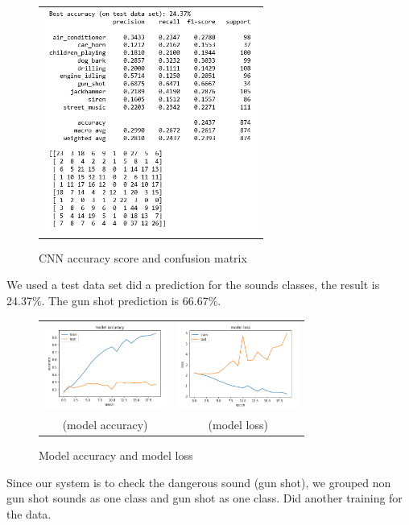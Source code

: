 \documentclass{article}
\begin{document}
\begin{figure}[!htb]
    \begin{tabular}{c}
        \includegraphics[width=7cm]{pic/CNN_Pm.png}\\
    \end{tabular}
	\caption{ CNN accuracy score and confusion matrix\label{figure7}}
\end{figure}
\newpage
We used a test data set did a prediction for the sounds classes, the result is 24.37\%. The gun shot prediction is 66.67\%.
\begin{figure}[!htb]
    \begin{tabular}{cc}
        \includegraphics[width=4cm]{pic/CNN_ACC.png}
        &\includegraphics[width=4cm]{pic/CNN_LOSS.PNG}\\
    (model accuracy)&(model loss)
    \end{tabular}
	\caption{Model accuracy and model loss\label{figure7}}
\end{figure}
\newpage
Since our system is to check the dangerous sound (gun shot), we grouped non gun shot sounds as one class and gun shot as one class. Did another training for the data.
\end{document}
